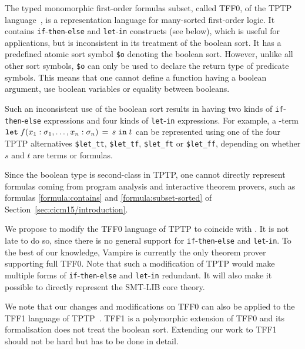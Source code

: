 The typed monomorphic first-order formulas subset, called TFF0, of the TPTP language~\cite{TPTP}, is a representation language for many-sorted first-order logic. It contains \verb'if'-\verb'then'-\verb'else' and \verb'let'-\verb'in' constructs (see below), which is useful for applications, but is inconsistent in its treatment of the boolean sort. It has a predefined atomic sort symbol \verb'$o' denoting the boolean sort. However, unlike all other sort symbols, \verb|$o| can only be used to declare the return type of predicate symbols. This means that one cannot define a function having a boolean argument, use boolean variables or equality between booleans. 

Such an inconsistent use of the boolean sort results in having two kinds of \verb'if'-\verb'then'-\verb'else' expressions and four kinds of \verb'let'-\verb'in' expressions. For example, a \folb-term $\mathtt{let}\;{f(x_1:\sigma_1, \ldots, x_n:\sigma_n)}\,=\,{s}\;\allowbreak\mathtt{in}\;{t}$ can be represented using one of the four TPTP alternatives \verb|$let_tt|, \verb|$let_tf|, \verb|$let_ft| or \verb|$let_ff|, depending on whether $s$ and $t$ are terms or formulas. 

Since the boolean type is second-class in TPTP, one cannot directly represent formulas coming from program analysis and interactive theorem provers, such as formulas \eqref{formula:contains} and \eqref{formula:subset-sorted} of Section~\ref{sec:cicm15/introduction}.

We propose to modify the TFF0 language of TPTP to coincide with \folb. It is not late to do so, since there is no general support for \verb'if'-\verb'then'-\verb'else' and \verb'let'-\verb'in'. To the best of our knowledge, Vampire is currently the only theorem prover supporting full TFF0. Note that such a modification of TPTP would make multiple forms of \verb'if'-\verb'then'-\verb'else' and \verb'let'-\verb'in' redundant. It will also make it possible to directly represent the SMT-LIB core theory.

We note that our changes and modifications on TFF0 can also be applied to the TFF1 language of TPTP~\cite{tff1}. TFF1 is  a polymorphic extension of TFF0 and its formalisation  does not treat the boolean sort. Extending our work to TFF1 should not be hard but has to be done in detail.
